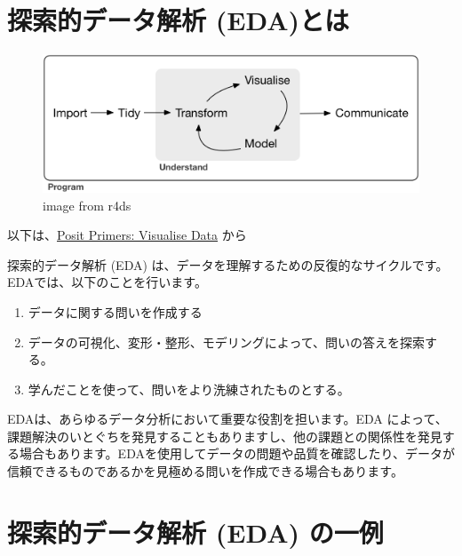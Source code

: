 \documentclass[
  xelatex, ja=standard]{bxjsbook}
\theoremstyle{definition}
\theoremstyle{definition}
\theoremstyle{definition}
\theoremstyle{definition}
\theoremstyle{remark}
\begin{document}
\hypertarget{ux63a2ux7d22ux7684ux30c7ux30fcux30bfux89e3ux6790-edaux3068ux306f}{%
\section{探索的データ解析 (EDA)とは}\label{ux63a2ux7d22ux7684ux30c7ux30fcux30bfux89e3ux6790-edaux3068ux306f}}

\begin{figure}
\centering
\includegraphics{./data/data-science.png}
\caption{image from r4ds}
\end{figure}

以下は、\href{https://posit.cloud/learn/primers/3.1}{Posit Primers: Visualise Data} から

探索的データ解析 (EDA) は、データを理解するための反復的なサイクルです。EDAでは、以下のことを行います。

\begin{enumerate}
\def\labelenumi{\arabic{enumi}.}
\item
  データに関する問いを作成する
\item
  データの可視化、変形・整形、モデリングによって、問いの答えを探索する。
\item
  学んだことを使って、問いをより洗練されたものとする。
\end{enumerate}

EDAは、あらゆるデータ分析において重要な役割を担います。EDA によって、課題解決のいとぐちを発見することもありますし、他の課題との関係性を発見する場合もあります。EDAを使用してデータの問題や品質を確認したり、データが信頼できるものであるかを見極める問いを作成できる場合もあります。

\hypertarget{ux63a2ux7d22ux7684ux30c7ux30fcux30bfux89e3ux6790-eda-ux306eux4e00ux4f8b}{%
\section{探索的データ解析 (EDA) の一例}\label{ux63a2ux7d22ux7684ux30c7ux30fcux30bfux89e3ux6790-eda-ux306eux4e00ux4f8b}}
\end{document}
